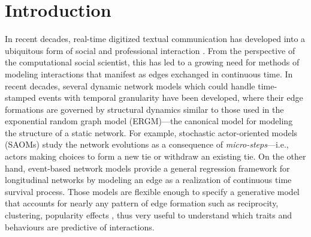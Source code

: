 \documentclass[ba]{imsart}
\numberwithin{equation}{section}
\theoremstyle{plain}
\begin{document}
\section{Introduction}\label{sec:introduction}

In recent decades, real-time digitized textual communication has developed into a ubiquitous form of social and professional interaction \citep{kanungo2008modeling, szostek2011dealing, burgess2004email, pew2016}. From the perspective of the computational social scientist, this has led to a growing need for methods of modeling interactions that manifest as edges exchanged in continuous time. In recent decades, several dynamic network models which could handle time-stamped events with temporal granularity have been developed, where their edge formations are governed by structural dynamics similar to those used in the exponential random graph model (ERGM)---the canonical model for modeling the structure of a static network. For example, stochastic actor-oriented models (SAOMs) \citep{snijders1996stochastic,snijders2007modeling} study the network evolutions as a consequence of \textit{micro-steps}---i.e., actors making choices to form a new tie or withdraw an existing tie. On the other hand, event-based network models \citep{Butts2008,Vu2011,hunter2011dynamic} provide a general regression framework for longitudinal networks by modeling an edge as a realization of continuous time survival process. Those models are flexible enough to specify a generative model that accounts for nearly any pattern of edge formation such as reciprocity, clustering, popularity effects \citep{desmarais2017statistical}, thus very useful to understand which traits and behaviours are predictive of interactions. 
\end{document}
